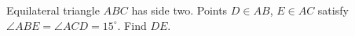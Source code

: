 Equilateral triangle $ABC$ has side two. Points $D\in AB$, $E\in AC$ satisfy $\angle ABE=\angle ACD=15^\circ$. Find $DE$.
